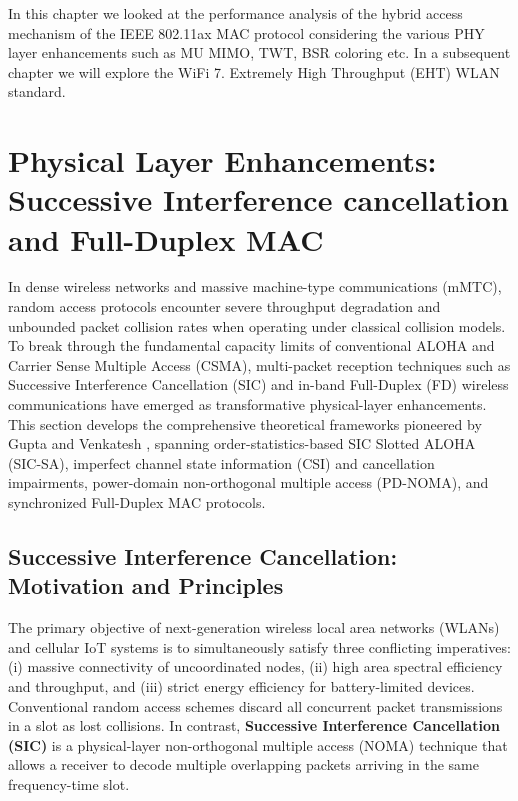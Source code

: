 In this chapter we looked at the performance analysis of the hybrid access mechanism of the IEEE 802.11ax MAC protocol considering the various PHY layer enhancements such as MU MIMO, TWT, BSR coloring etc. In a subsequent chapter we will explore the WiFi 7. Extremely High Throughput (EHT) WLAN standard.

\chapter{Physical Layer Enhancements: Successive Interference cancellation and Full-Duplex MAC}
\label{sec:sic_fd_mac}
In dense wireless networks and massive machine-type communications (mMTC), random access protocols encounter severe throughput degradation and unbounded packet collision rates when operating under classical collision models. To break through the fundamental capacity limits of conventional ALOHA and Carrier Sense Multiple Access (CSMA), multi-packet reception techniques such as Successive Interference Cancellation (SIC) and in-band Full-Duplex (FD) wireless communications have emerged as transformative physical-layer enhancements. This section develops the comprehensive theoretical frameworks pioneered by Gupta and Venkatesh \cite{gupta2022sic, gupta2022design}, spanning order-statistics-based SIC Slotted ALOHA (SIC-SA), imperfect channel state information (CSI) and cancellation impairments, power-domain non-orthogonal multiple access (PD-NOMA), and synchronized Full-Duplex MAC protocols.

\section{Successive Interference Cancellation: Motivation and Principles}
The primary objective of next-generation wireless local area networks (WLANs) and cellular IoT systems is to simultaneously satisfy three conflicting imperatives: (i) massive connectivity of uncoordinated nodes, (ii) high area spectral efficiency and throughput, and (iii) strict energy efficiency for battery-limited devices. Conventional random access schemes discard all concurrent packet transmissions in a slot as lost collisions. In contrast, \textbf{Successive Interference Cancellation (SIC)} is a physical-layer non-orthogonal multiple access (NOMA) technique that allows a receiver to decode multiple overlapping packets arriving in the same frequency-time slot.

